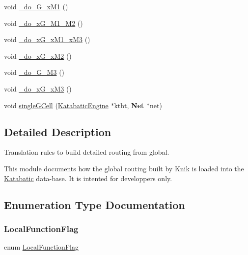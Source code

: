 \begin{DoxyCompactItemize}
void \mbox{\hyperlink{group__LoadGlobalRouting_ga97942453a1bc5b01106aa380271fd7fc}{\+\_\+do\+\_\+G\+\_\+x\+M1}} ()
\item 
void \mbox{\hyperlink{group__LoadGlobalRouting_gae60ed4e27ad89a1e2ff2cd6415ef33f1}{\+\_\+do\+\_\+x\+G\+\_\+M1\+\_\+M2}} ()
\item 
void \mbox{\hyperlink{group__LoadGlobalRouting_gaf9b009520f54099668ac9d12f2c85257}{\+\_\+do\+\_\+x\+G\+\_\+x\+M1\+\_\+x\+M3}} ()
\item 
void \mbox{\hyperlink{group__LoadGlobalRouting_ga532d1c6b530e0375078ea2d6ea3c6024}{\+\_\+do\+\_\+x\+G\+\_\+x\+M2}} ()
\item 
void \mbox{\hyperlink{group__LoadGlobalRouting_ga2519ef984b3d19f123827a9b12651672}{\+\_\+do\+\_\+G\+\_\+M3}} ()
\item 
void \mbox{\hyperlink{group__LoadGlobalRouting_ga007efc725aae31782204a44949765cb4}{\+\_\+do\+\_\+x\+G\+\_\+x\+M3}} ()
\item 
void \mbox{\hyperlink{group__LoadGlobalRouting_ga3973291866b39c10cea5ca17f7d174fb}{single\+G\+Cell}} (\mbox{\hyperlink{classKatabatic_1_1KatabaticEngine}{Katabatic\+Engine}} $\ast$ktbt, \textbf{ Net} $\ast$net)
\end{DoxyCompactItemize}


\subsection{Detailed Description}
Translation rules to build detailed routing from global. 

This module documents how the global routing built by {\ttfamily Knik} is loaded into the {\ttfamily \mbox{\hyperlink{namespaceKatabatic}{Katabatic}}} data-\/base. It is intented for developpers only. 

\subsection{Enumeration Type Documentation}
\mbox{\label{group__LoadGlobalRouting_gaec07c7f30c801c3b0f72193757250d64}} 
\subsubsection{\texorpdfstring{Local\+Function\+Flag}{LocalFunctionFlag}}
{\footnotesize\ttfamily enum \mbox{\hyperlink{group__LoadGlobalRouting_gaec07c7f30c801c3b0f72193757250d64}{Local\+Function\+Flag}}}

